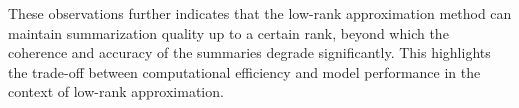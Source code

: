 These observations further indicates that the low-rank approximation method can maintain summarization quality up to a certain rank, beyond which the coherence and accuracy of the summaries degrade significantly. This highlights the trade-off between computational efficiency and model performance in the context of low-rank approximation.

